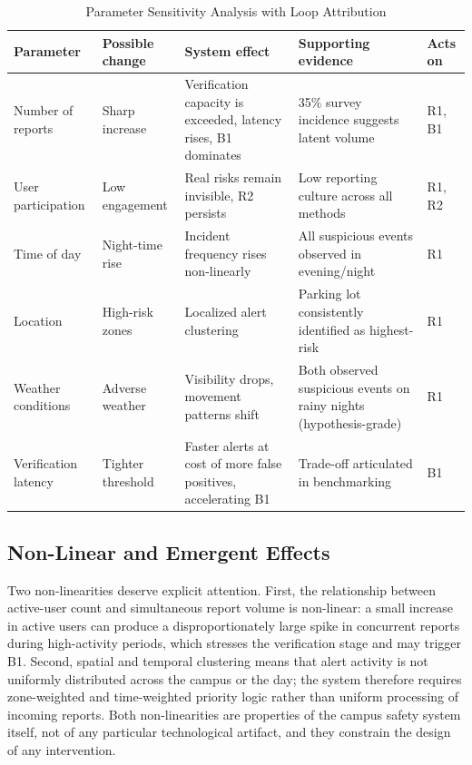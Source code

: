 \documentclass[conference]{IEEEtran}
\begin{document}
\begin{table}[t]
\caption{Parameter Sensitivity Analysis with Loop Attribution}
\label{tab:sens}
\centering
\renewcommand{\arraystretch}{1.2}
\begin{tabular}{p{2.6cm}p{2.5cm}p{4.2cm}p{4.4cm}p{1.8cm}}
\toprule
\textbf{Parameter} & \textbf{Possible change} & \textbf{System effect} & \textbf{Supporting evidence} & \textbf{Acts on} \\
\midrule
Number of reports & Sharp increase & Verification capacity is exceeded, latency rises, B1 dominates & 35\% survey incidence suggests latent volume & R1, B1 \\
User participation & Low engagement & Real risks remain invisible, R2 persists & Low reporting culture across all methods & R1, R2 \\
Time of day & Night-time rise & Incident frequency rises non-linearly & All suspicious events observed in evening/night & R1 \\
Location & High-risk zones & Localized alert clustering & Parking lot consistently identified as highest-risk & R1 \\
Weather conditions & Adverse weather & Visibility drops, movement patterns shift & Both observed suspicious events on rainy nights (hypothesis-grade) & R1 \\
Verification latency & Tighter threshold & Faster alerts at cost of more false positives, accelerating B1 & Trade-off articulated in benchmarking & B1 \\
\bottomrule
\end{tabular}
\end{table}

\subsection{Non-Linear and Emergent Effects}
Two non-linearities deserve explicit attention. First, the
relationship between active-user count and simultaneous report volume
is non-linear: a small increase in active users can produce a
disproportionately large spike in concurrent reports during
high-activity periods, which stresses the verification stage and may
trigger B1. Second, spatial and temporal clustering means that alert
activity is not uniformly distributed across the campus or the day;
the system therefore requires zone-weighted and time-weighted priority
logic rather than uniform processing of incoming reports. Both
non-linearities are properties of the campus safety system itself,
not of any particular technological artifact, and they constrain the
design of any intervention.
\end{document}
